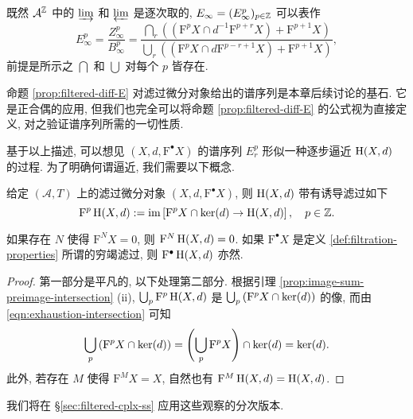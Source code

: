 既然 $\mathcal{A}^{\mathbb{Z}}$ 中的 $\varinjlim$ 和 $\varprojlim$ 是逐次取的, $E_\infty = (E_\infty^p)_{p \in \mathbb{Z}}$ 可以表作
\begin{equation}\label{eqn:filtered-diff-infty}
	E_\infty^p = \dfrac{Z_\infty^p}{B_\infty^p} = \dfrac{\bigcap_r \left( (\mathrm{F}^p X \cap d^{-1} \mathrm{F}^{p+r} X) + \mathrm{F}^{p+1} X \right) }{\bigcup_r \left((\mathrm{F}^p X \cap d \mathrm{F}^{p-r+1} X ) + \mathrm{F}^{p+1} X\right)} ,
\end{equation}
前提是所示之 $\bigcap$ 和 $\bigcup$ 对每个 $p$ 皆存在.

\begin{remark}
	命题 \ref{prop:filtered-diff-E} 对滤过微分对象给出的谱序列是本章后续讨论的基石. 它是正合偶的应用, 但我们也完全可以将命题 \ref{prop:filtered-diff-E} 的公式视为直接定义, 对之验证谱序列所需的一切性质.
\end{remark}

基于以上描述, 可以想见 $(X, d, \mathrm{F}^\bullet X)$ 的谱序列 $E_r^p$ 形似一种逐步逼近 $\operatorname{H}(X, d)$ 的过程. 为了明确何谓逼近, 我们需要以下概念.

\begin{definition}[诱导滤过]\label{def:induced-filtration-H}
	给定 $(\mathcal{A}, T)$ 上的滤过微分对象 $(X, d, \mathrm{F}^\bullet X)$, 则 $\operatorname{H}(X,d)$ 带有诱导滤过如下
	\[ \mathrm{F}^p \operatorname{H}(X,d) := \operatorname{im}\left[ \mathrm{F}^p X \cap \operatorname{ker}(d) \to \operatorname{H}(X, d) \right], \quad p \in \mathbb{Z}. \]
\end{definition}

\begin{lemma}\label{prop:induced-filtration-H}
	如果存在 $N$ 使得 $\mathrm{F}^N X = 0$, 则 $\mathrm{F}^N \operatorname{H}(X, d) = 0$. 如果 $\mathrm{F}^\bullet X$ 是定义 \ref{def:filtration-properties} 所谓的穷竭滤过, 则 $\mathrm{F}^\bullet \operatorname{H}(X, d)$ 亦然.
\end{lemma}
\begin{proof}
	第一部分是平凡的, 以下处理第二部分. 根据引理 \ref{prop:image-sum-preimage-intersection} (ii), $\bigcup_p \mathrm{F}^p \operatorname{H}(X,d)$ 是 $\bigcup_p \left( \mathrm{F}^p X \cap \operatorname{ker}(d) \right)$ 的像, 而由 \eqref{eqn:exhaustion-intersection} 可知
	\[ \bigcup_p \left( \mathrm{F}^p X \cap \operatorname{ker}(d) \right) = \left(\bigcup_p \mathrm{F}^p X\right) \cap \operatorname{ker}(d) = \operatorname{ker}(d). \]
	此外, 若存在 $M$ 使得 $\mathrm{F}^M X = X$, 自然也有 $\mathrm{F}^M \operatorname{H}(X, d) = \operatorname{H}(X, d)$.
\end{proof}

我们将在 \S\ref{sec:filtered-cplx-ss} 应用这些观察的分次版本.

